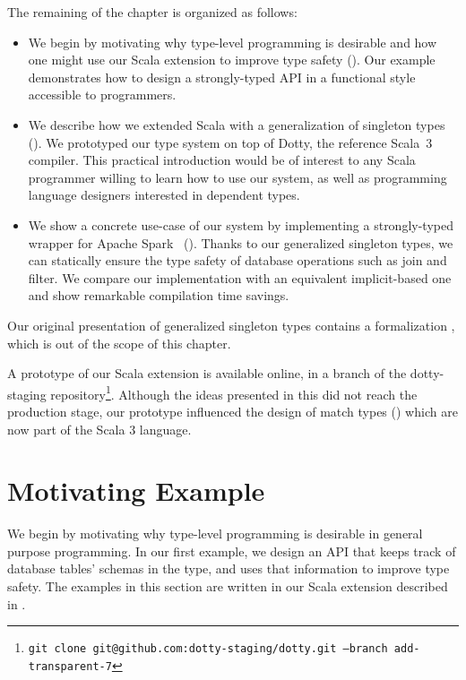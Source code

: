 The remaining of the chapter is organized as follows:

\begin{itemize}
\item
  We begin by motivating why type-level programming is desirable and how one might use our Scala extension to improve type safety (). Our example demonstrates how to design a strongly-typed API in a functional style accessible to programmers.
\item
  We describe how we extended Scala with a generalization of singleton types ().
  We prototyped our type system on top of Dotty, the reference Scala~3 compiler.
  This practical introduction would be of interest to any Scala programmer willing to learn how to use our system, as well as programming language designers interested in dependent types.
\item
  We show a concrete use-case of our system by implementing a strongly-typed wrapper for Apache Spark~\citep{zaharia2016apache} ().
  Thanks to our generalized singleton types, we can statically ensure the type safety of database operations such as join and filter.
  We compare our implementation with an equivalent implicit-based one and show remarkable compilation time savings.
\end{itemize}

Our original presentation of generalized singleton types contains a formalization \citep[Section 3 and 4]{schmid2020coming}, which is out of the scope of this chapter.

\begin{diff}
A prototype of our Scala extension is available online, in a branch of the dotty-staging repository\footnote{\texttt{git clone git@github.com:dotty-staging/dotty.git --branch add-transparent-7}}.
Although the ideas presented in this did not reach the production stage, our prototype influenced the design of match types () which are now part of the Scala 3 language.
\end{diff}

\section{Motivating Example}
\label{sec:motivating-example}

We begin by motivating why type-level programming is desirable in general purpose programming.
In our first example, we design an API that keeps track of database tables' schemas in the type, and uses that information to improve type safety.
The examples in this section are written in our Scala extension described in .

